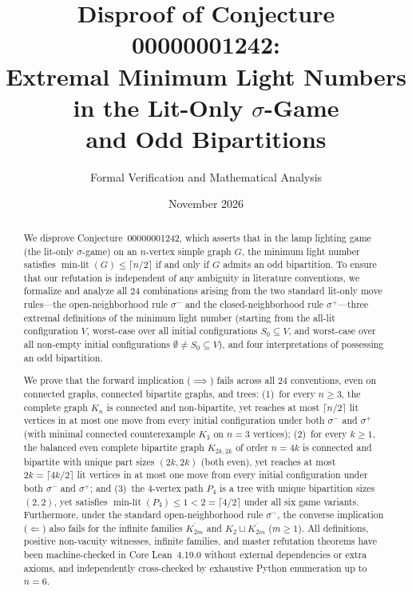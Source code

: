 \documentclass[11pt,a4paper]{article}
\title{\textbf{Disproof of Conjecture 00000001242:\\
Extremal Minimum Light Numbers in the Lit-Only $\sigma$-Game\\
and Odd Bipartitions}}
\author{Formal Verification and Mathematical Analysis}
\date{November 2026}
\theoremstyle{definition}
\newcommand{\ceilhalf}[1]{\lceil #1 / 2 \rceil}
\begin{document}
\maketitle

\begin{abstract}
We disprove Conjecture~00000001242, which asserts that in the lamp lighting game
(the lit-only $\sigma$-game) on an $n$-vertex simple graph $G$, the minimum light
number satisfies $\operatorname{min-lit}(G) \le \ceilhalf{n}$ if and only if $G$
admits an odd bipartition. To ensure that our refutation is independent of any
ambiguity in literature conventions, we formalize and analyze all $24$ combinations
arising from the two standard lit-only move rules---the open-neighborhood rule
$\sigma^-$ and the closed-neighborhood rule $\sigma^+$---three extremal definitions
of the minimum light number (starting from the all-lit configuration $V$, worst-case
over all initial configurations $S_0 \subseteq V$, and worst-case over all non-empty
initial configurations $\emptyset \neq S_0 \subseteq V$), and four interpretations
of possessing an odd bipartition.

We prove that the forward implication ($\implies$) fails across all $24$ conventions,
even on connected graphs, connected bipartite graphs, and trees:
(1)~for every $n \ge 3$, the complete graph $K_n$ is connected and non-bipartite,
yet reaches at most $\ceilhalf{n}$ lit vertices in at most one move from every
initial configuration under both $\sigma^-$ and $\sigma^+$ (with minimal connected
counterexample $K_3$ on $n = 3$ vertices);
(2)~for every $k \ge 1$, the balanced even complete bipartite graph $K_{2k,2k}$ of
order $n = 4k$ is connected and bipartite with unique part sizes $(2k, 2k)$ (both
even), yet reaches at most $2k = \ceilhalf{4k}$ lit vertices in at most one move from
every initial configuration under both $\sigma^-$ and $\sigma^+$; and
(3)~the $4$-vertex path $P_4$ is a tree with unique bipartition sizes $(2, 2)$, yet
satisfies $\operatorname{min-lit}(P_4) \le 1 < 2 = \ceilhalf{4}$ under all six game
variants. Furthermore, under the standard open-neighborhood rule $\sigma^-$, the
converse implication ($\Longleftarrow$) also fails for the infinite families
$\overline{K_{2m}}$ and $K_2 \sqcup \overline{K_{2m}}$ ($m \ge 1$). All definitions,
positive non-vacuity witnesses, infinite families, and master refutation theorems
have been machine-checked in Core Lean~4.19.0 without external dependencies or
extra axioms, and independently cross-checked by exhaustive Python enumeration up
to $n = 6$.
\end{abstract}
\end{document}
